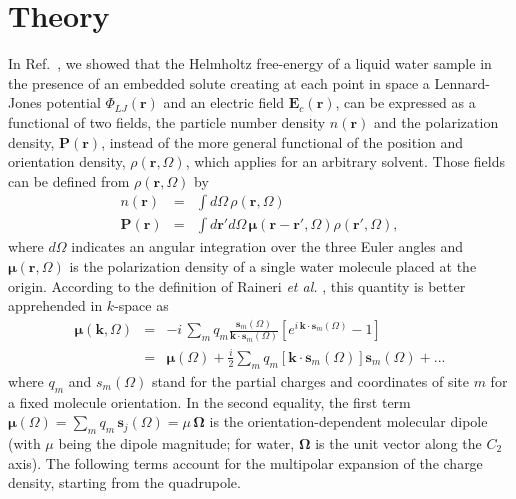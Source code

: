 \documentclass[aip,jcp,showpacs,amsmath,amssymb,superscriptaddress]{revtex4-1}
\newcommand{\bea}{\begin{eqnarray}}
\newcommand{\eea}{\end{eqnarray}}
\newcommand{\rr}{\mathbf{r}}
\newcommand{\kk}{\mathbf{k}}
\newcommand{\rhorom}{{\rho\left({\mathbf r},\Omega\right)}}
\newcommand{\Om}{\mathbf{\Omega}}
\newcommand{\nr}{n(\mathbf{r})}
\newcommand{\Pol}{\mathbf{P}({\mathbf r})}
\newcommand{\MU}{\boldsymbol{\mu}}
\newcommand{\etal}{{\em et  al. }}
\begin{document}
\section{Theory}

In Ref.~, we showed that the Helmholtz free-energy of a liquid water sample  in the presence of an embedded solute  creating at each point in space a Lennard-Jones potential
$\Phi_{LJ}(\rr)$ and an electric field  $\mathbf{E}_c(\rr)$, can be expressed as a functional of two fields, the particle number density $\nr$ and the polarization density, $\Pol$, instead of the more general functional of  the position and orientation density, $\rhorom$, which applies for an arbitrary solvent\cite{gendre09,zhao11,borgis12}. Those fields can be defined from $\rhorom$ by
\bea
\nr & = &\int d\Omega  \, \rhorom \\
 \Pol   & = & \int d\rr' d\Omega \, \MU(\rr-\rr', \Omega) \rho(\mathbf{r}',\Omega),
 \eea
where $d\Omega$ indicates an angular integration over the three Euler angles and $\MU(\rr,\Omega)$ is the polarization density of a single water molecule placed at the origin. According to the definition of Raineri \etal \cite{raineri93},  this quantity is better apprehended
in $k$-space as 
\bea
\MU(\kk,\Omega) &= & -i \, \sum_m q_m \frac{\mathbf{s}_m(\Omega) }{\kk \cdot \mathbf{s}_m(\Omega) } \left[ e^{i \, \kk \cdot \mathbf{s}_m(\Omega) } -1 \right] \\
\label{eq:mukom}
&= & \MU(\Omega) + \frac{i}{2} \sum_m q_m \left[ \kk \cdot \mathbf{s}_m(\Omega) \right]  \mathbf{s}_m(\Omega) + ... 
\eea
where $q_m$ and $s_m(\Omega)$ stand for the partial charges and coordinates of site $m$ for a fixed molecule orientation.
 In the second equality, the first term $\MU(\Omega) = \sum_m q_m \, \mathbf{s}_j(\Omega) =  \mu \, \Om$  is the orientation-dependent molecular dipole (with $\mu$ being the  dipole magnitude; for water,
 $\Om$  is the unit vector along the $C_{2}$ axis). The following terms account for the multipolar expansion of the charge density, starting from the quadrupole. 
\end{document}
